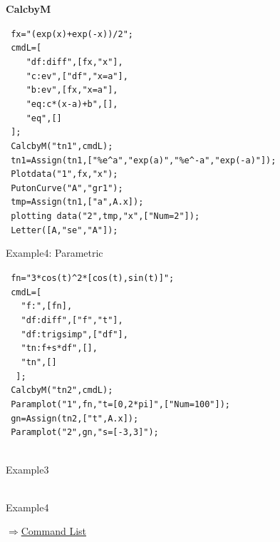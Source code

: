 \documentclass[papersize,a4paper,12pt]{article}
\newenvironment{cmd}[2]{
\hypertarget{#2}{}
\begin{center}{\bf\large #1}\end{center}
\begin{description}
}{
\end{description}
\begin{flushright} \hyperlink{functionlist}{$\Rightarrow$Command List}\end{flushright}
}
\begin{document}
\begin{cmd}{CalcbyM}{calcbym}
\verb| fx="(exp(x)+exp(-x))/2"; |\\
\verb| cmdL=[ |\\
\verb|    "df:diff",[fx,"x"], |\\
\verb|    "c:ev",["df","x=a"], |\\
\verb|    "b:ev",[fx,"x=a"], |\\
\verb|    "eq:c*(x-a)+b",[], |\\
\verb|    "eq",[] |\\
\verb| ]; |\\
\verb| CalcbyM("tn1",cmdL); |\\
\verb| tn1=Assign(tn1,["%e^a","exp(a)","%e^-a","exp(-a)"]); |\\
\verb| Plotdata("1",fx,"x"); |\\
\verb| PutonCurve("A","gr1"); |\\
\verb| tmp=Assign(tn1,["a",A.x]); |\\
\verb| plotting data("2",tmp,"x",["Num=2"]); |\\
\verb| Letter([A,"se","A"]);|

Example4: Parametric

\verb| fn="3*cos(t)^2*[cos(t),sin(t)]";|\\
\verb| cmdL=[|\\
\verb|   "f:",[fn], |\\
\verb|   "df:diff",["f","t"], |\\
\verb|   "df:trigsimp",["df"], |\\
\verb|   "tn:f+s*df",[], |\\
\verb|   "tn",[] |\\
\verb|  ]; |\\
\verb| CalcbyM("tn2",cmdL); |\\
\verb| Paramplot("1",fn,"t=[0,2*pi]",["Num=100"]); |\\
\verb| gn=Assign(tn2,["t",A.x]); |\\
\verb| Paramplot("2",gn,"s=[-3,3]"); |\\
 
\begin{minipage}{65mm}
\begin{center}
\\
Example3
\end{center}
\end{minipage}
\begin{minipage}{65mm}
\begin{center}
\vspace*{5mm}

\vspace{10mm}\\
Example4
\end{center}
\end{minipage}

\end{cmd}
\end{document}
